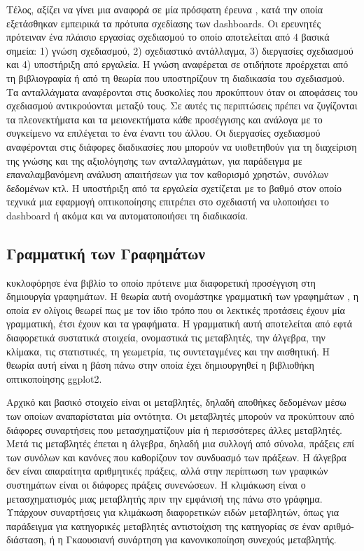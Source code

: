 \documentclass{article}
\begin{document}
Τέλος, αξίζει να γίνει μια αναφορά σε μία πρόσφατη έρευνα \cite{bach2022dashboard}, κατά την οποία εξετάσθηκαν εμπειρικά τα πρότυπα σχεδίασης των dashboards. Οι ερευνητές πρότειναν ένα πλάισιο εργασίας σχεδιασμού το οποίο αποτελείται από 4 βασικά σημεία: 1) γνώση σχεδιασμού, 2) σχεδιαστικό αντάλλαγμα, 3) διεργασίες σχεδιασμού και 4) υποστήριξη από εργαλεία. Η γνώση αναφέρεται σε οτιδήποτε προέρχεται από τη βιβλιογραφία ή από τη θεωρία που υποστηρίζουν τη διαδικασία του σχεδιασμού. Τα ανταλλάγματα αναφέρονται στις δυσκολίες που προκύπτουν όταν οι αποφάσεις του σχεδιασμού αντικρούονται μεταξύ τους. Σε αυτές τις περιπτώσεις πρέπει να ζυγίζονται τα πλεονεκτήματα και τα μειονεκτήματα κάθε προσέγγισης και ανάλογα με το συγκείμενο να επιλέγεται το ένα έναντι του άλλου. Οι διεργασίες σχεδιασμού αναφέρονται στις διάφορες διαδικασίες που μπορούν να υιοθετηθούν για τη διαχείριση της γνώσης και της αξιολόγησης των ανταλλαγμάτων, για παράδειγμα με επαναλαμβανόμενη ανάλυση απαιτήσεων για τον καθορισμό χρηστών, συνόλων δεδομένων κτλ. Η υποστήριξη από τα εργαλεία σχετίζεται με το βαθμό στον οποίο τεχνικά μια εφαρμογή οπτικοποίησης επιτρέπει στο σχεδιαστή να υλοποιήσει το dashboard ή ακόμα και να αυτοματοποιήσει τη διαδικασία.

\subsection{Γραμματική των Γραφημάτων}

 κυκλοφόρησε ένα βιβλίο το οποίο πρότεινε μια διαφορετική προσέγγιση στη δημιουργία γραφημάτων. Η θεωρία αυτή ονομάστηκε γραμματική των γραφημάτων \cite{wilkinson2012grammar}, η οποία εν ολίγοις θεωρεί πως με τον ίδιο τρόπο που οι λεκτικές προτάσεις έχουν μία γραμματική, έτσι έχουν και τα γραφήματα. Η γραμματική αυτή αποτελείται από εφτά διαφορετικά συστατικά στοιχεία, ονομαστικά τις μεταβλητές, την άλγεβρα, την κλίμακα, τις στατιστικές, τη γεωμετρία, τις συντεταγμένες και την αισθητική. Η θεωρία αυτή είναι η βάση πάνω στην οποία έχει δημιουργηθεί η βιβλιοθήκη οπτικοποίησης ggplot2.

Αρχικό και βασικό στοιχείο είναι οι μεταβλητές, δηλαδή αποθήκες δεδομένων μέσω των οποίων αναπαρίσταται μία οντότητα. Οι μεταβλητές μπορούν να προκύπτουν από διάφορες συναρτήσεις που μετασχηματίζουν μία ή περισσότερες άλλες μεταβλητές. Μετά τις μεταβλητές έπεται η άλγεβρα, δηλαδή μια συλλογή από σύνολα, πράξεις επί των συνόλων και κανόνες που καθορίζουν τον συνδυασμό των πράξεων. Η άλγεβρα δεν είναι απαραίτητα αριθμητικές πράξεις, αλλά στην περίπτωση των γραφικών συστημάτων είναι οι διάφορες πράξεις συνενώσεων. Η κλιμάκωση είναι ο μετασχηματισμός μιας μεταβλητής πριν την εμφάνισή της πάνω στο γράφημα. Υπάρχουν συναρτήσεις για κλιμάκωση διαφορετικών ειδών μεταβλητών, όπως για παράδειγμα για κατηγορικές μεταβλητές αντιστοίχιση της κατηγορίας σε έναν αριθμό-διάσταση, ή η Γκαουσιανή συνάρτηση για κανονικοποίηση συνεχούς μεταβλητής.
\end{document}
